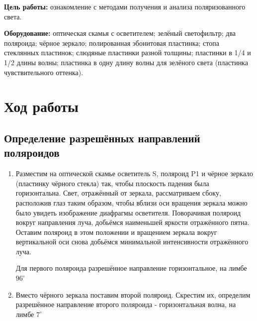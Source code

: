 


  


\textbf{Цель работы:} ознакомление с методами получения и анализа поляризованного света.

\textbf{Оборудование:} оптическая скамья с осветителем; зелёный светофильтр; два поляроида; чёрное зеркало; полированная эбонитовая пластинка; стопа стеклянных пластинок; слюдяные пластинки разной толщины; пластинки в 1/4 и 1/2 длины волны; пластинка в одну длину волны для зелёного света (пластинка чувствительного оттенка).



\section{Ход работы}

\subsection{Определение разрешённых направлений поляроидов}
\begin{enumerate}
    \item Разместим на оптической скамье осветитель
S, поляроид P1 и чёрное зеркало (пластинку чёрного стекла) так, чтобы плоскость падения была горизонтальна. Свет, отражённый от зеркала, рассматриваем сбоку, расположив глаз таким образом, чтобы вблизи оси вращения зеркала можно было увидеть изображение диафрагмы осветителя.
Поворачивая поляроид вокруг направления луча, добьёмся наименьшей яркости отражённого пятна. Оставим поляроид в этом положении
и вращением зеркала вокруг вертикальной оси снова добьёмся минимальной интенсивности отражённого луча.

\begin{figure}[h!]
\end{figure}

\par Для первого поляроида разрешённое направление горизонтальное, на лимбе $96^{\circ}$
\item Вместо чёрного зеркала поставим второй поляроид. Скрестим их, определим разрешённое направление второго поляроида - горизонтальная волна, на лимбе $7^{\circ}$
\end{enumerate}

